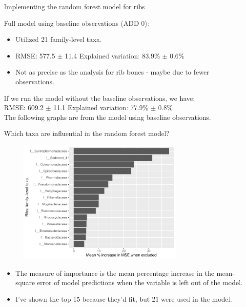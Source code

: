\documentclass{beamer}
\begin{document}
\begin{frame}{Implementing the random forest model for ribs}

Full model using baseline observations (ADD 0):
\begin{itemize}
\item Utilized 21 family-level taxa.
\item RMSE: 577.5 $\pm$  11.4 \hspace{0.05in}  Explained variation: 83.9\%
$\pm$ 0.6\%
\item Not as precise as the analysis for rib bones - maybe due to fewer
observations.
\end{itemize}

\vspace{0.1in}

If we run the model without the baseline observations, we have:\\
\noindent RMSE: 609.2 $\pm$ 11.1 \hspace{0.05in}  Explained variation: 77.9\%
$\pm$ 0.8\%\\
\vspace{0.05in}
The following graphs are from the model using baseline observations.

\end{frame}



\begin{frame}{Which taxa are influential in the random forest model?}

  \begin{center}
    \begin{figure}
      \includegraphics[width=3.25in]{use_families/w_ribs/w_baseline/families_rib_PercIncMSE_barchart}
    \end{figure}
  \end{center}
  \vspace{-0.1in}
  \scriptsize{
  \begin{itemize}
    \item The measure of importance is the mean percentage increase in the
    mean-square error of model predictions when the variable is left out of the
    model. 
    \item I've shown the top 15 because they'd fit, but 21 were used in the
    model.
  \end{itemize}
  }

\end{frame}
\end{document}
